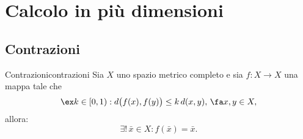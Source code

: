 %
%
\chapter{Calcolo in più dimensioni}
\section{Contrazioni}

\begin{teor}{Contrazioni}{contrazioni}
	Sia \(X\) uno spazio metrico completo e sia \(f\colon X\to X\) una mappa tale che
	\[
		\ex k\in[0,1):d\big(f(x),f(y)\big)\le k\,d(x,y),\,\fa x,y\in X,
	\]
	allora:
	\[
		\exists!\,\bar{x}\in X:f(\bar{x})=\bar{x}.
	\]
\end{teor}

